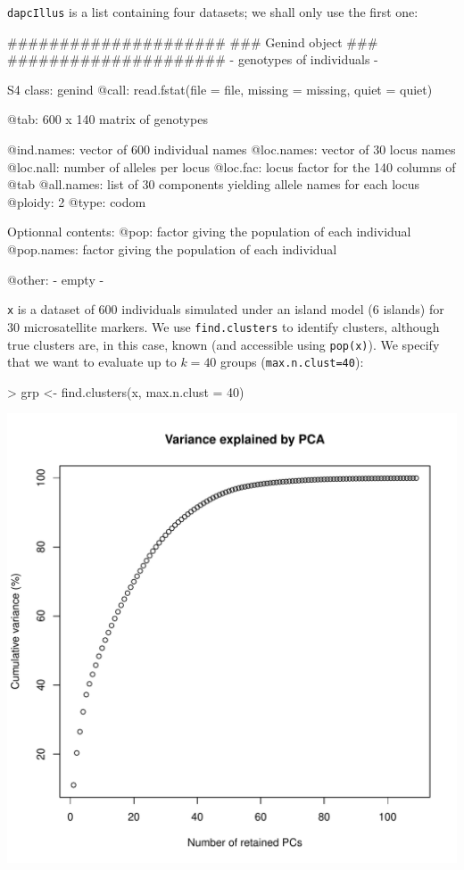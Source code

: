 \documentclass{article}
\newcommand{\code}[1]{{{\tt #1}}}
\begin{document}
\texttt{dapcIllus} is a list containing four datasets; we shall only use the first one:
\begin{Schunk}
\begin{Soutput}
   #####################
   ### Genind object ### 
   #####################
- genotypes of individuals - 

S4 class:  genind
@call: read.fstat(file = file, missing = missing, quiet = quiet)

@tab:  600 x 140 matrix of genotypes

@ind.names: vector of  600 individual names
@loc.names: vector of  30 locus names
@loc.nall: number of alleles per locus
@loc.fac: locus factor for the  140 columns of @tab
@all.names: list of  30 components yielding allele names for each locus
@ploidy:  2
@type:  codom

Optionnal contents: 
@pop:  factor giving the population of each individual
@pop.names:  factor giving the population of each individual

@other: - empty -
\end{Soutput}
\end{Schunk}
\texttt{x} is a dataset of 600 individuals simulated under an island model (6 islands) for 30 microsatellite markers.
We use \code{find.clusters} to identify clusters, although true clusters are, in this case, known
(and accessible using \texttt{pop(x)}).
We specify that we want to evaluate up to $k=40$ groups (\texttt{max.n.clust=40}):
\begin{Schunk}
\begin{Sinput}
> grp <- find.clusters(x, max.n.clust = 40)
\end{Sinput}
\end{Schunk}

\begin{center}
  \includegraphics[width=.7\textwidth]{figs/findclust-pca.pdf}
\end{center}
\end{document}

